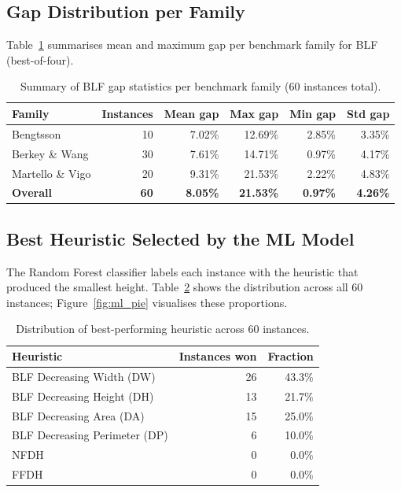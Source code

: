 \documentclass[11pt,a4paper]{article}
\begin{document}
\subsection{Gap Distribution per Family}

Table~\ref{tab:family_summary} summarises mean and maximum gap per benchmark
family for BLF (best-of-four).

\begin{table}[h]
\centering
\caption{Summary of BLF gap statistics per benchmark family (60 instances total).}
\label{tab:family_summary}
\begin{tabular}{lrrrrr}
\toprule
Family & Instances & Mean gap & Max gap & Min gap & Std gap \\
\midrule
Bengtsson      & 10 & 7.02\% & 12.69\% &  2.85\% & 3.35\% \\
Berkey \& Wang & 30 & 7.61\% & 14.71\% &  0.97\% & 4.17\% \\
Martello \& Vigo & 20 & 9.31\% & 21.53\% & 2.22\% & 4.83\% \\
\midrule
\textbf{Overall} & \textbf{60} & \textbf{8.05\%} & \textbf{21.53\%} & \textbf{0.97\%} & \textbf{4.26\%} \\
\bottomrule
\end{tabular}
\end{table}

\subsection{Best Heuristic Selected by the ML Model}

The Random Forest classifier labels each instance with the heuristic that
produced the smallest height.
Table~\ref{tab:ml_dist} shows the distribution across all 60 instances;
Figure~\ref{fig:ml_pie} visualises these proportions.

\begin{table}[h]
\centering
\caption{Distribution of best-performing heuristic across 60 instances.}
\label{tab:ml_dist}
\begin{tabular}{lrr}
\toprule
Heuristic & Instances won & Fraction \\
\midrule
BLF Decreasing Width (DW)     & 26 & 43.3\% \\
BLF Decreasing Height (DH)    & 13 & 21.7\% \\
BLF Decreasing Area (DA)      & 15 & 25.0\% \\
BLF Decreasing Perimeter (DP) &  6 & 10.0\% \\
NFDH                           &  0 &  0.0\% \\
FFDH                           &  0 &  0.0\% \\
\bottomrule
\end{tabular}
\end{table}
\end{document}

